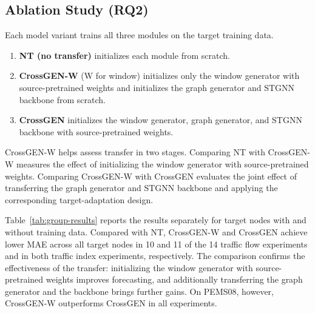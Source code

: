 \documentclass[runningheads,a4paper]{llncs}
\begin{document}
\subsection{Ablation Study (RQ2)}
\label{sec:configuration-scope}

\begingroup
\DeclareRobustCommand{\ablationpar}{\par}



\DeclareRobustCommand{\ablationvariants}{%
  \begin{samepage}
    Each model variant trains all three modules on the target training data.
    \begin{enumerate}
    \item \textbf{NT (no transfer)} initializes each module from scratch.
    \item \textbf{CrossGEN-W} (W for window) initializes only the window generator with source-pretrained weights and initializes the graph generator and STGNN backbone from scratch.
    \item \textbf{CrossGEN} initializes the window generator, graph generator, and STGNN backbone with source-pretrained weights.
    \end{enumerate}
  \end{samepage}%
}
\ablationvariants
CrossGEN-W helps assess transfer in two stages. Comparing NT with CrossGEN-W measures the effect of initializing the window generator with source-pretrained weights. Comparing CrossGEN-W with CrossGEN evaluates the joint effect of transferring the graph generator and STGNN backbone and applying the corresponding target-adaptation design.
\ablationpar
Table~\ref{tab:group-results} reports the results separately for target nodes with and without training data.
Compared with NT, CrossGEN-W and CrossGEN achieve lower MAE across all target nodes in 10 and 11 of the 14 traffic flow experiments and in both traffic index experiments, respectively. The comparison confirms the effectiveness of the transfer: initializing the window generator with source-pretrained weights improves forecasting, and additionally transferring the graph generator and the backbone brings further gains. On PEMS08, however, CrossGEN-W outperforms CrossGEN in all experiments.
\par
\endgroup
\end{document}
